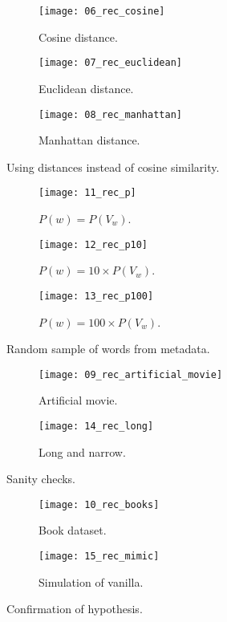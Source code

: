 \begin{figure}
  \centering
  \begin{subfigure}{0.3\textwidth}
    \centering
    \texttt{[image: 06\_rec\_cosine]}
    \caption{Cosine distance.\label{fig:fig3:a}}
  \end{subfigure}
  \begin{subfigure}{0.3\textwidth}
    \centering
    \texttt{[image: 07\_rec\_euclidean]}
    \caption{Euclidean distance.\label{fig:fig3:b}}
  \end{subfigure}
  \begin{subfigure}{0.3\textwidth}
    \centering
    \texttt{[image: 08\_rec\_manhattan]}
    \caption{Manhattan distance.\label{fig:fig3:c}}
  \end{subfigure}
  \caption{Using distances instead of cosine similarity.\label{fig:fig3}}
\end{figure}

\begin{figure}
  \centering
  \begin{subfigure}{0.3\textwidth}
    \centering
    \texttt{[image: 11\_rec\_p]}
    \caption{$P(w) = P(V_w)$.\label{fig:fig4:a}}
  \end{subfigure}
  \begin{subfigure}{0.3\textwidth}
    \centering
    \texttt{[image: 12\_rec\_p10]}
    \caption{$P(w) = 10 \times P(V_w)$.\label{fig:fig4:b}}
  \end{subfigure}
  \begin{subfigure}{0.3\textwidth}
    \centering
    \texttt{[image: 13\_rec\_p100]}
    \caption{$P(w) = 100 \times P(V_w)$.\label{fig:fig4:c}}
  \end{subfigure}
  \caption{Random sample of words from metadata.\label{fig:fig4}}
\end{figure}

\begin{figure}
  \centering
  \begin{subfigure}{0.45\textwidth}
    \centering
    \texttt{[image: 09\_rec\_artificial\_movie]}
    \caption{Artificial movie.\label{fig:fig5:a}}
  \end{subfigure}
  \begin{subfigure}{0.45\textwidth}
    \centering
    \texttt{[image: 14\_rec\_long]}
    \caption{Long and narrow.\label{fig:fig5:b}}
  \end{subfigure}
  \caption{Sanity checks.\label{fig:fig5}}
\end{figure}

\begin{figure}
  \centering
  \begin{subfigure}{0.45\textwidth}
    \centering
    \texttt{[image: 10\_rec\_books]}
    \caption{Book dataset.\label{fig:fig6:a}}
  \end{subfigure}
  \begin{subfigure}{0.45\textwidth}
    \centering
    \texttt{[image: 15\_rec\_mimic]}
    \caption{Simulation of vanilla.\label{fig:fig6:b}}
  \end{subfigure}
  \caption{Confirmation of hypothesis.\label{fig:fig6}}
\end{figure}
